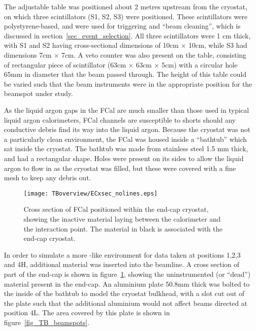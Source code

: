 The adjustable table was positioned about 2 metres upstream from the cryostat, on which three scintillators (S1, S2, S3) were positioned. These scintillators were polystyrene-based, and were used for triggering and ``beam cleaning'', which is discussed in section~\ref{sec_event_selection}. All three scintillators were 1 cm thick, with S1 and S2 having cross-sectional dimensions of 10cm $\times$ 10cm, while S3 had dimensions 7cm $\times$ 7cm. A veto counter was also present on the table, consisting of rectangular piece of scintillator (63cm $\times$ 63cm $\times$ 5cm) with a circular hole 65mm in diameter that the beam passed through. The height of this table could be varied such that the beam instruments were in the appropriate position for the beamspot under study. 

As the liquid argon gaps in the FCal are much smaller than those used in typical liquid argon calorimeters, FCal channels are susceptible to shorts should any conductive debris find its way into the liquid argon. Because the cryostat was not a particularly clean environment, the FCal was housed inside a ``bathtub'' which sat inside the cryostat. The bathtub was made from stainless steel 1.5 mm thick, and had a rectangular shape. Holes were present on its sides to allow the liquid argon to flow in as the cryostat was filled, but these were covered with a fine mesh to keep any debris out. 

\begin{figure}[h]
\begin{center}
\texttt{[image: TBoverview/ECxsec\_nolines.eps]}
\end{center}

\caption{Cross section of FCal positioned within the end-cap cryostat, showing the inactive material laying between the calorimeter and the interaction point. The material in black is associated with the end-cap cryostat.}
\label{end_cap_xsec_2}
\end{figure}

In order to simulate a more \atlas-like environment for data taken at positions 1,2,3 and 4H, additional material was inserted into the beamline. A cross section of part of the \atlas end-cap is shown in figure~\ref{end_cap_xsec_2}, showing the uninstrumented (or ``dead'') material present in the end-cap. An aluminium plate 50.8mm thick was bolted to the inside of the bathtub to model the cryostat bulkhead, with a slot cut out of the plate such that the additional aluminium would not affect beams directed at position 4L. The area covered by this plate is shown in figure~\ref{fig_TB_beamspots}.

